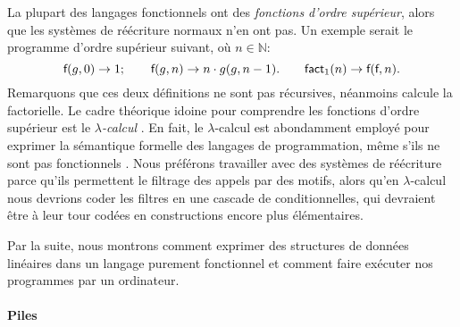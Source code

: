 La plupart des langages fonctionnels ont des \emph{fonctions d'ordre
  supérieur},
alors que les systèmes de réécriture normaux n'en ont pas. Un exemple
serait le programme d'ordre supérieur suivant, où \(n \in
\mathbb{N}\):
\begin{equation*}
\textsf{f}(g,0) \rightarrow 1;
\qquad
\textsf{f}(g,n) \rightarrow n \cdot g(g,n-1).
\qquad
\textsf{fact}_1(n) \rightarrow \textsf{f}(\textsf{f},n).
\end{equation*}
Remarquons que ces deux définitions ne sont pas récursives, néanmoins
 calcule la
factorielle. Le cadre théorique idoine pour
comprendre les fonctions d'ordre supérieur est le
\emph{\(\lambda\)-calcul}
\citep{HindleySeldin_2008,VanLeeuwen_1990b}. En
fait, le \(\lambda\)-calcul est abondamment employé pour exprimer la
sémantique formelle des langages de programmation, même s'ils ne sont
pas fonctionnels
\citep{Winskel_1993,Reynolds_1998,Pierce_2002,FriedmanWand_2008,TurbakGifford_2008}. Nous
préférons travailler avec des systèmes de réécriture parce qu'ils
permettent le filtrage des appels par des motifs, alors qu'en
\(\lambda\)-calcul nous devrions
coder les filtres en une cascade de conditionnelles, qui devraient
être à leur tour codées en constructions encore plus élémentaires.

Par la suite, nous montrons comment exprimer des structures de données
linéaires dans un langage purement fonctionnel et comment faire
exécuter nos programmes par un ordinateur.

\paragraph{Piles}
\label{par:stacks}


